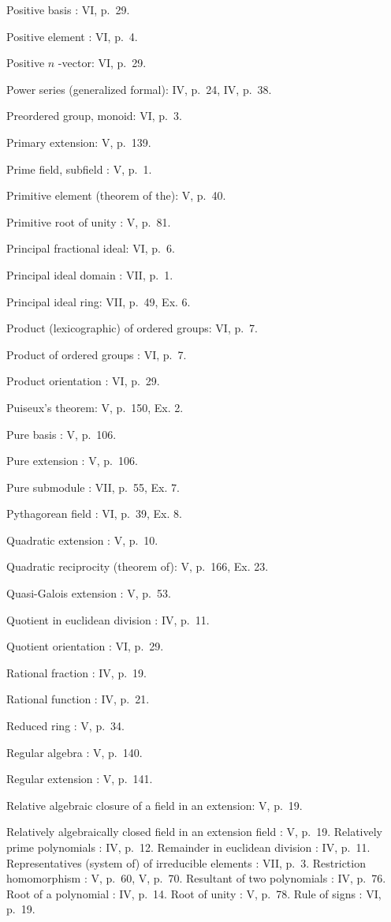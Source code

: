Positive basis : VI, p.~29.

Positive element : VI, p.~4.

Positive \(n\) -vector: VI, p.~29.

Power series (generalized formal): IV, p.~24, IV, p.~38.

Preordered group, monoid: VI, p.~3.

Primary extension: V, p.~139.

Prime field, subfield : V, p.~1.

Primitive element (theorem of the): V, p.~40.

Primitive root of unity : V, p.~81.

Principal fractional ideal: VI, p.~6.

Principal ideal domain : VII, p.~1.

Principal ideal ring: VII, p.~49, Ex. 6.

Product (lexicographic) of ordered groups: VI, p.~7.

Product of ordered groups : VI, p.~7.

Product orientation : VI, p.~29.

Puiseux's theorem: V, p.~150, Ex. 2.

Pure basis : V, p.~106.

Pure extension : V, p.~106.

Pure submodule : VII, p.~55, Ex. 7.

Pythagorean field : VI, p.~39, Ex. 8.

Quadratic extension : V, p.~10.

Quadratic reciprocity (theorem of): V, p.~166, Ex. 23.

Quasi-Galois extension : V, p.~53.

Quotient in euclidean division : IV, p.~11.

Quotient orientation : VI, p.~29.

Rational fraction : IV, p.~19.

Rational function : IV, p.~21.

Reduced ring : V, p.~34.

Regular algebra : V, p.~140.

Regular extension : V, p.~141.

Relative algebraic closure of a field in an extension: V, p.~19.

Relatively algebraically closed field in an extension field : V, p.~19. Relatively prime polynomials : IV, p.~12. Remainder in euclidean division : IV, p.~11. Representatives (system of) of irreducible elements : VII, p.~3. Restriction homomorphism : V, p.~60, V, p.~70. Resultant of two polynomials : IV, p.~76. Root of a polynomial : IV, p.~14. Root of unity : V, p.~78. Rule of signs : VI, p.~19.

